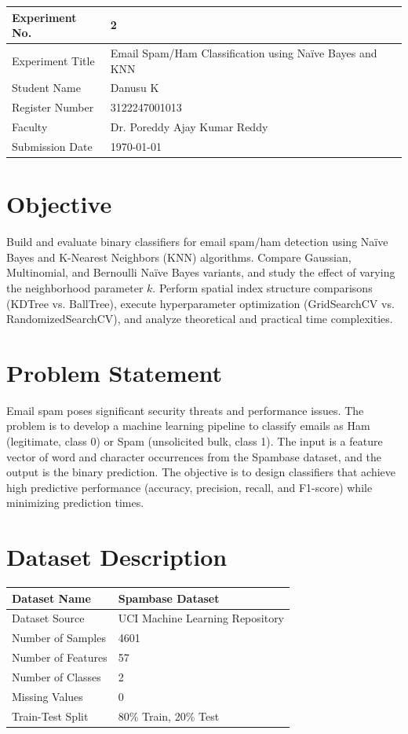 \documentclass[12pt,a4paper]{article}
\begin{document}
\begin{tabular}{|p{4cm}|p{11cm}|}
\hline
Experiment No. & 2 \\ \hline
Experiment Title & Email Spam/Ham Classification using Na\"ive Bayes and KNN\footnotemark \\ \hline
Student Name & Danusu K \\ \hline
Register Number & 3122247001013 \\ \hline
Faculty & Dr. Poreddy Ajay Kumar Reddy \\ \hline
Submission Date & \today \\ \hline
\end{tabular}

\section{Objective}
Build and evaluate binary classifiers for email spam/ham detection using Na\"ive Bayes and K-Nearest Neighbors (KNN) algorithms. Compare Gaussian, Multinomial, and Bernoulli Na\"ive Bayes variants, and study the effect of varying the neighborhood parameter $k$. Perform spatial index structure comparisons (KDTree vs. BallTree), execute hyperparameter optimization (GridSearchCV vs. RandomizedSearchCV), and analyze theoretical and practical time complexities.

\section{Problem Statement}
Email spam poses significant security threats and performance issues. The problem is to develop a machine learning pipeline to classify emails as Ham (legitimate, class 0) or Spam (unsolicited bulk, class 1). The input is a feature vector of word and character occurrences from the Spambase dataset, and the output is the binary prediction. The objective is to design classifiers that achieve high predictive performance (accuracy, precision, recall, and F1-score) while minimizing prediction times.

\section{Dataset Description}
\begin{longtable}{|p{6cm}|p{8cm}|}
\hline
Dataset Name & Spambase Dataset \\ \hline
Dataset Source & UCI Machine Learning Repository \\ \hline
Number of Samples & 4601 \\ \hline
Number of Features & 57 \\ \hline
Number of Classes & 2 \\ \hline
Missing Values & 0 \\ \hline
Train-Test Split & 80\% Train, 20\% Test \\ \hline
\end{longtable}
\end{document}

